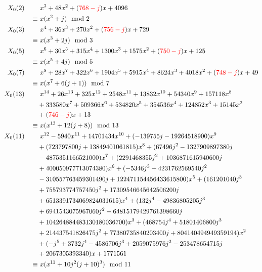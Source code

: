 \documentclass{rs}
\theoremstyle{definition}
\theoremstyle{remark}
\newcommand{\md}{~~{\rm mod}~}
\renewcommand{\=}{\approx}
\renewcommand{\-}{\sim}
\newcommand{\rd}[1]{\textcolor{red}{#1}}
\numberwithin{equation}{section}
\numberwithin{thm}{section}
\begin{document}
\begin{equation*}
   \begin{split}
     X_0(2) \qquad & ~ x^3+48 x^2+(\rd{768-j}) x+4096 \\
            \equiv & ~ x (x^2 + j) \md 2 \\
     X_0(3) \qquad & ~ x^4+36 x^3+270 x^2+(\rd{756-j}) x+729 \\
            \equiv & ~ x (x^3 + 2 j) \md 3 \\
     X_0(5) \qquad & ~ x^6+30 x^5+315 x^4+1300 x^3+1575 x^2+(\rd{750-j}) x+125 \\
            \equiv & ~ x (x^5 + 4 j) \md 5 \\
     X_0(7) \qquad & ~ x^8+28 x^7+322 x^6+1904 x^5+5915 x^4+8624 x^3+4018 x^2+(\rd{748-j}) x+49 \\
            \equiv & ~ x (x^7 + 6 (j + 1)) \md 7 \\
    X_0(13) \qquad & ~ x^{14}+26 x^{13}+325 x^{12}+2548 x^{11}+13832 x^{10}+54340 x^9+157118 x^8 \\
                   & +333580 x^7+509366 x^6+534820 x^5+354536 x^4+124852 x^3+15145 x^2 \\
                   & +(\rd{746-j}) x+13 \\
            \equiv & ~ x (x^{13} + 12 (j + 8)) \md 13 \\
    X_0(11) \qquad & ~ x^{12}-5940 x^{11}+14701434 x^{10}+(-139755 j-19264518900) x^9 \\
                   & +(723797800 j +13849401061815) x^8+(67496 j^2-1327909897380 j \\
                   & -4875351166521000) x^7+(2291468355 j^2+1036871615940600 j \\
                   & +400050977713074380) x^6+(-5346 j^3+4231762569540 j^2 \\
                   & -310557763459301490 j+122471154456433615800) x^5+(161201040 j^3 \\
                   & +755793774757450 j^2+17309546645642506200 j \\
                   & +6513391734069824031615) x^4+(132 j^4-49836805205 j^3 \\
                   & +6941543075967060 j^2-64815179429761398660 j \\
                   & +104264884483130180036700) x^3+(468754 j^4+51801406800 j^3 \\
                   & +214437541826475 j^2+77380735840203400 j+804140494949359194) x^2 \\
                   & +(-j^5+3732 j^4-4586706 j^3+2059075976 j^2-253478654715 j \\
                   & +2067305393340) x+1771561 \\
            \equiv & ~ x (x^{11} + 10 j^2 (j + 10)^3) \md 11 \\
   \end{split}
  \end{equation*}
\end{document}
